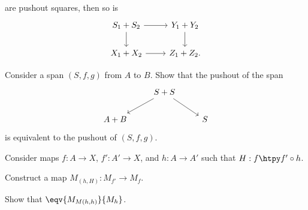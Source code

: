 \begin{exercises}
\begin{equation*}
\end{equation*}
are pushout squares, then so is
\begin{equation*}
\begin{tikzcd}
S_1+S_2 \arrow[r] \arrow[d] & Y_1+ Y_2 \arrow[d] \\
X_1 +X_2 \arrow[r] & Z_1+Z_2. 
\end{tikzcd}
\end{equation*}
\item Consider a span $(S,f,g)$ from $A$ to $B$. Show that the pushout of the span
\begin{equation*}
\begin{tikzcd}
& S+S \arrow[dl] \arrow[dr] \\
A + B & & S
\end{tikzcd}
\end{equation*}
is equivalent to the pushout of $(S,f,g)$.
\item Consider maps $f:A\to X$, $f':A'\to X$, and $h:A\to A'$ such that $H:f\htpy f'\circ h$. 
\begin{subexenum}
\item Construct a map $M_{(h,H)}: M_{f'}\to M_f$.
\item Show that $\eqv{M_{M(h,h)}}{M_h}$.
\end{subexenum}
\end{exercises}
